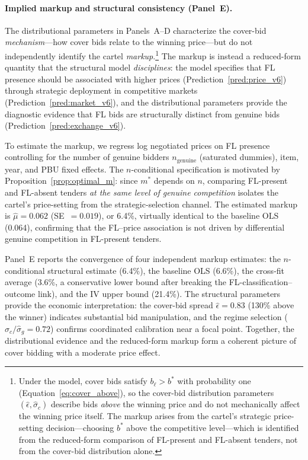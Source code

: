 \paragraph{Implied markup and structural consistency (Panel~E).}
The distributional parameters in Panels~A--D characterize the
cover-bid \emph{mechanism}---how cover bids relate to the winning
price---but do not independently identify the cartel
\emph{markup}.\footnote{Under the model, cover bids satisfy
$b_\ell > b^*$ with probability one (Equation~\ref{eq:cover_above}),
so the cover-bid distribution parameters $(\hat{\epsilon},
\hat{\sigma}_c)$ describe bids \emph{above} the winning price and
do not mechanically affect the winning price itself. The markup
arises from the cartel's strategic price-setting decision---choosing
$b^*$ above the competitive level---which is identified from the
reduced-form comparison of FL-present and FL-absent tenders, not
from the cover-bid distribution alone.}
The markup is instead a reduced-form quantity that the structural
model \emph{disciplines}: the model specifies that FL presence should
be associated with higher prices
(Prediction~\ref{pred:price_v6}) through strategic deployment in
competitive markets (Prediction~\ref{pred:market_v6}), and the
distributional parameters provide the diagnostic evidence that FL
bids are structurally distinct from genuine bids
(Prediction~\ref{pred:exchange_v6}).

To estimate the markup, we regress log negotiated prices on FL
presence controlling for the number of genuine bidders
$n_{\text{genuine}}$ (saturated dummies), item, year, and PBU fixed
effects. The $n$-conditional specification is motivated by
Proposition~\ref{prop:optimal_m}: since $m^*$ depends on $n$,
comparing FL-present and FL-absent tenders \emph{at the same level of
genuine competition} isolates the cartel's price-setting from the
strategic-selection channel. The estimated markup is $\hat{\mu} =
0.062$ (SE~$= 0.019$), or 6.4\%, virtually identical to the baseline
OLS (0.064), confirming that the FL--price association is not driven
by differential genuine competition in FL-present tenders.

Panel~E reports the convergence of four independent markup estimates:
the $n$-conditional structural estimate (6.4\%), the baseline OLS
(6.6\%), the cross-fit average (3.6\%, a conservative lower bound
after breaking the FL-classification--outcome link), and the IV upper
bound (21.4\%). The structural parameters provide the economic
interpretation: the cover-bid spread $\hat{\epsilon} = 0.83$
(130\% above the winner) indicates substantial bid manipulation, and
the regime selection ($\hat{\sigma}_c / \hat{\sigma}_g = 0.72$)
confirms coordinated calibration near a focal point. Together, the
distributional evidence and the reduced-form markup form a coherent
picture of cover bidding with a moderate price effect.

